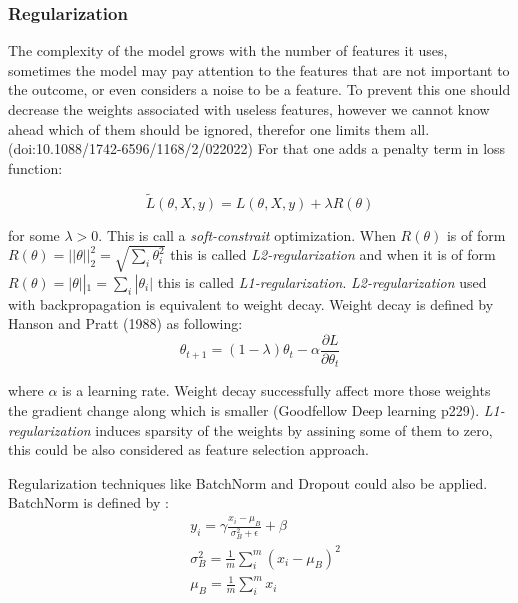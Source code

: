 \subsubsection{Regularization}

The complexity of the model grows with the number of features it uses, sometimes the model may pay attention to the features that are not important to the outcome, or even considers a noise to be a feature. To prevent this one should decrease the weights associated with useless features, however we cannot know ahead which of them should be ignored, therefor one limits them all. (doi:10.1088/1742-6596/1168/2/022022) For that one adds a penalty term in loss function:

\begin{equation}
   \tilde{L}(\theta, X, y) = L(\theta, X, y) + \lambda R(\theta)
\end{equation}

for some $\lambda > 0$. This is call a \emph{soft-constrait} optimization. When $R(\theta)$ is of form $R(\theta) = ||\theta||^2_2 = \sqrt{\sum_i \theta_i^2}$ this is called \emph{L2-regularization} and when it is of form $R(\theta) = |\theta||_1 = \sum_i |\theta_i|$ this is called \emph{L1-regularization}. \emph{L2-regularization} used with backpropagation is equivalent to weight decay. Weight decay is defined by Hanson and Pratt (1988) as following:
\begin{equation}
    \theta_{t+1} = (1 - \lambda)\theta_t - \alpha \frac{\partial L}{\partial \theta_t}
\end{equation}

where $\alpha$ is a learning rate. Weight decay successfully affect more those weights the gradient change along which is smaller (Goodfellow Deep learning p229). \emph{L1-regularization} induces sparsity of the weights by assining some of them to zero, this could be also considered as feature selection approach.

Regularization techniques like BatchNorm and Dropout could also be applied. BatchNorm is defined by :
\begin{equation}
    \begin{split}
    & y_i = \gamma \frac{x_i - \mu_B}{\sigma^2_B + \epsilon} + \beta \\
    & \sigma^2_B = \frac{1}{m} \sum_i^m (x_i - \mu_B)^2 \\
    & \mu_B = \frac{1}{m} \sum_i^m x_i \\
    \end{split}
\end{equation}

